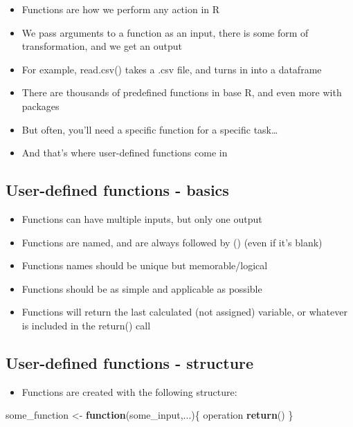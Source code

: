 \documentclass[]{article}
\newenvironment{Shaded}{\begin{snugshade}}{\end{snugshade}}
\newcommand{\KeywordTok}[1]{\textcolor[rgb]{0.13,0.29,0.53}{\textbf{#1}}}
\newcommand{\StringTok}[1]{\textcolor[rgb]{0.31,0.60,0.02}{#1}}
\newcommand{\ControlFlowTok}[1]{\textcolor[rgb]{0.13,0.29,0.53}{\textbf{#1}}}
\newcommand{\NormalTok}[1]{#1}
\providecommand{\tightlist}{%
  \setlength{\itemsep}{0pt}\setlength{\parskip}{0pt}}
\begin{document}
\begin{itemize}
\tightlist
\item
  Functions are how we perform any action in R
\item
  We pass arguments to a function as an input, there is some form of
  transformation, and we get an output
\item
  For example, read.csv() takes a .csv file, and turns in into a
  dataframe
\item
  There are thousands of predefined functions in base R, and even more
  with packages
\item
  But often, you'll need a specific function for a specific task\ldots{}
\item
  And that's where user-defined functions come in
\end{itemize}

\subsection{User-defined functions -
basics}\label{user-defined-functions---basics}

\begin{itemize}
\tightlist
\item
  Functions can have multiple inputs, but only one output
\item
  Functions are named, and are always followed by () (even if it's
  blank)
\item
  Functions names should be unique but memorable/logical
\item
  Functions should be as simple and applicable as possible
\item
  Functions will return the last calculated (not assigned) variable, or
  whatever is included in the return() call
\end{itemize}

\subsection{User-defined functions -
structure}\label{user-defined-functions---structure}

\begin{itemize}
\tightlist
\item
  Functions are created with the following structure:
\end{itemize}

\begin{Shaded}
\begin{Highlighting}[]
\NormalTok{some_function <-}\StringTok{ }\ControlFlowTok{function}\NormalTok{(some_input,...)\{}
\NormalTok{  operation}
  \KeywordTok{return}\NormalTok{()}
\NormalTok{\}}
\end{Highlighting}
\end{Shaded}
\end{document}
